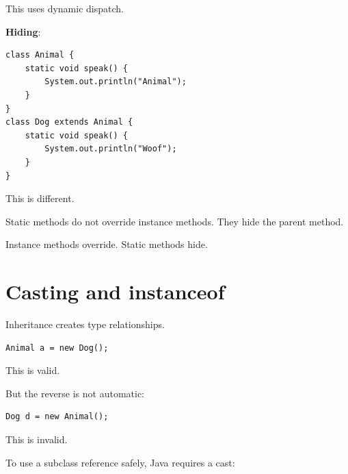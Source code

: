 \documentclass[11pt,a4paper]{book}
\begin{document}

This uses dynamic dispatch.


\textbf{Hiding}:

\begin{verbatim}
class Animal {
    static void speak() {
        System.out.println("Animal");
    }
}
class Dog extends Animal {
    static void speak() {
        System.out.println("Woof");
    }
}
\end{verbatim}


This is different.

Static methods do not override instance methods.
They hide the parent method.


\begin{rosettarule}
Instance methods override.
Static methods hide.
\end{rosettarule}


\section{Casting and instanceof}

Inheritance creates type relationships.

\begin{verbatim}
Animal a = new Dog();
\end{verbatim}


This is valid.

But the reverse is not automatic:

\begin{verbatim}
Dog d = new Animal();
\end{verbatim}


This is invalid.


To use a subclass reference safely, Java requires a cast:
\end{document}

